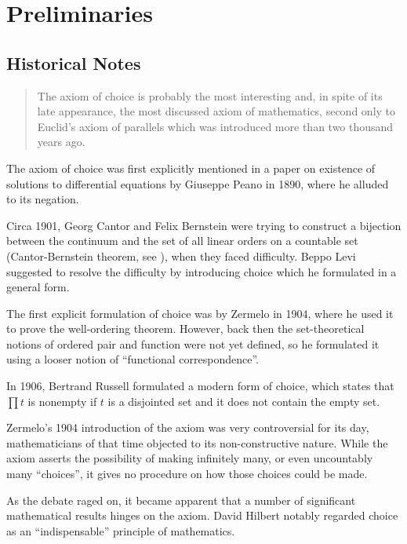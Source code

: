 \chapter{Preliminaries}
\section{Historical Notes}

\begin{quote}
    The axiom of choice is probably the most interesting and, in spite of its late appearance, the most discussed axiom of mathematics,
    second only to Euclid's axiom of parallels which was introduced more than two thousand years ago. \autocite{fraenkel1973}
\end{quote}
The axiom of choice was first explicitly mentioned in a paper on existence of solutions to differential equations by Giuseppe Peano in 1890,
where he alluded to its negation.

Circa 1901, Georg Cantor and Felix Bernstein were trying to construct a bijection between the continuum and the set of all linear orders on a countable set (Cantor-Bernstein theorem, see \autocite[3]{hausdorff2005}), when they faced difficulty. Beppo Levi suggested to resolve the difficulty by introducing choice which he formulated in a general form.

The first explicit formulation of choice was by Zermelo in 1904, where he used it to prove the well-ordering theorem.
However, back then the set-theoretical notions of ordered pair and function were not yet defined, so he formulated it using a looser notion of ``functional correspondence''.

In 1906, Bertrand Russell formulated a modern form of choice, which states that \(\prod t\) is nonempty if \(t\) is a disjointed set and it does not contain the empty set.


Zermelo's 1904 introduction of the axiom was very controversial for its day, mathematicians of that time objected to its non-constructive nature.
While the axiom asserts the possibility of making infinitely many, or even uncountably many ``choices'', it gives no procedure on how those choices could be made.

As the debate raged on, it became apparent that a number of significant mathematical results hinges on the axiom.
David Hilbert notably regarded choice as an ``indispensable'' principle of mathematics.

